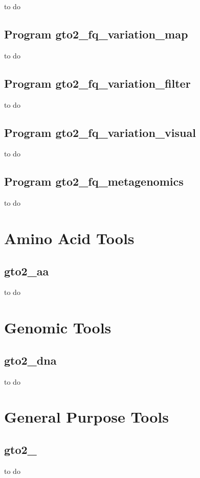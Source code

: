 \documentclass[11pt,]{krantz}
\begin{document}
to do

\section{Program
gto2\_fq\_variation\_map}\label{program-gto2_fq_variation_map}

to do

\section{Program
gto2\_fq\_variation\_filter}\label{program-gto2_fq_variation_filter}

to do

\section{Program
gto2\_fq\_variation\_visual}\label{program-gto2_fq_variation_visual}

to do

\section{Program
gto2\_fq\_metagenomics}\label{program-gto2_fq_metagenomics}

to do

\chapter{Amino Acid Tools}\label{amino-acid-tools}

\section{gto2\_aa}\label{gto2_aa}

to do

\chapter{Genomic Tools}\label{genomic-tools}

\section{gto2\_dna}\label{gto2_dna}

to do

\chapter{General Purpose Tools}\label{general-purpose-tools}

\section{gto2\_}\label{gto2_}

to do



\printindex
\end{document}
